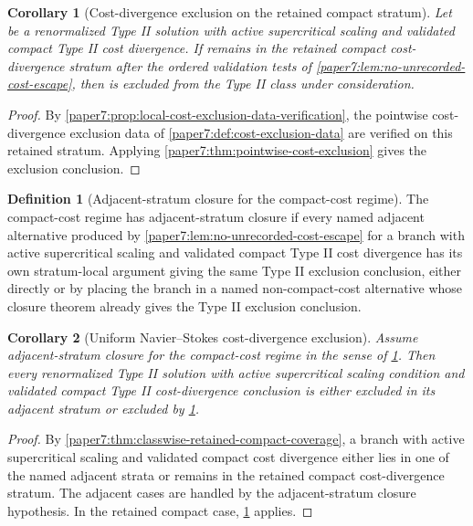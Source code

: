 \documentclass[11pt]{amsart}
\def\({}%
\def\){}%
\theoremstyle{plain}
\newtheorem{corollary}[corollary]{Corollary}
\theoremstyle{definition}
\newtheorem{definition}[definition]{Definition}
\theoremstyle{remark}
\begin{document}
\begin{corollary}[Cost-divergence exclusion on the retained compact stratum]
\label{paper7:cor:retained-stratum-cost-exclusion}
Let \(\omega\) be a renormalized Type II solution with active supercritical
scaling and validated compact Type II cost divergence.  If \(\omega\) remains
in the retained compact cost-divergence stratum after the ordered validation
tests of \cref{paper7:lem:no-unrecorded-cost-escape}, then \(\omega\) is
excluded from the Type II class under consideration.
\end{corollary}

\begin{proof}
By \cref{paper7:prop:local-cost-exclusion-data-verification}, the pointwise
cost-divergence exclusion data of \cref{paper7:def:cost-exclusion-data} are
verified on this retained stratum.  Applying
\cref{paper7:thm:pointwise-cost-exclusion} gives the exclusion conclusion.
\end{proof}

\begin{definition}[Adjacent-stratum closure for the compact-cost regime]
\label{paper7:def:compact-cost-adjacent-closure}
The compact-cost regime has adjacent-stratum closure if every named adjacent
alternative produced by
\cref{paper7:lem:no-unrecorded-cost-escape} for a branch with active
supercritical scaling and validated compact Type II cost divergence has its own
stratum-local argument giving the same Type II exclusion conclusion, either
directly or by placing the branch in a named non-compact-cost
alternative whose closure theorem already gives the Type II exclusion
conclusion.
\end{definition}

\begin{corollary}[Uniform Navier--Stokes cost-divergence exclusion]
\label{paper7:cor:uniform-cost-exclusion}
Assume adjacent-stratum closure for the compact-cost regime in the sense of
\cref{paper7:def:compact-cost-adjacent-closure}.  Then every
renormalized Type II solution with active supercritical scaling condition and
validated compact Type II cost-divergence conclusion is either excluded in its
adjacent stratum or excluded by
\cref{paper7:cor:retained-stratum-cost-exclusion}.
\end{corollary}

\begin{proof}
By \cref{paper7:thm:classwise-retained-compact-coverage}, a branch with active
supercritical scaling and validated compact cost divergence either lies in one
of the named adjacent strata or remains in the retained compact
cost-divergence stratum.  The adjacent cases are handled by the
adjacent-stratum closure hypothesis.  In the retained compact case,
\cref{paper7:cor:retained-stratum-cost-exclusion} applies.
\end{proof}
\end{document}
